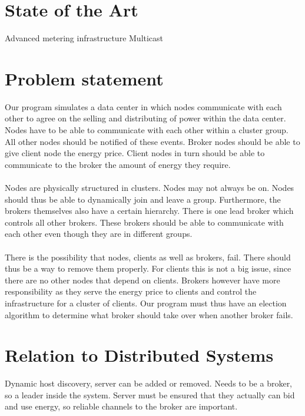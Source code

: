 \documentclass[10pt]{article} %
\begin{document}
\section{State of the Art}

Advanced metering infrastructure
Multicast  

\section{Problem statement}
Our program simulates a data center in which nodes communicate with each other to agree on the selling and distributing of power within the data center. Nodes have to be able to communicate with each other within a cluster group. All other nodes should be notified of these events. Broker nodes should be able to give client node the energy price. Client nodes in turn should be able to communicate  to the broker the amount of energy they require.\\
\\
Nodes are physically structured in clusters. Nodes may not always be on. Nodes should thus be able to dynamically join and leave a group. Furthermore, the brokers themselves also have a certain hierarchy. There is one lead broker which controls all other brokers. These brokers should be able to communicate with each other even though they are in different groups. \\
\\
There is the possibility that nodes, clients as well as brokers, fail. There should thus be a way to remove them properly. For clients this is not a big issue, since there are no other nodes that depend on clients. Brokers however have more responsibility as they serve the energy price to clients and control the infrastructure for a cluster of clients. Our program must thus have an election algorithm to determine what broker should take over when another broker fails.



\section{Relation to Distributed Systems}

Dynamic host discovery, server can be added or removed. 
Needs to be a broker, so a leader inside the system. 
Server must be ensured that they actually can bid and use energy, so reliable channels to the broker are important.
\end{document}
